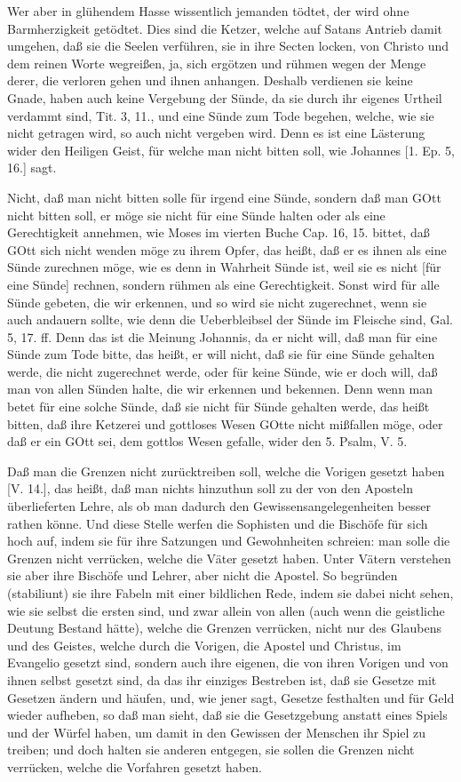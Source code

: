 Wer aber in glühendem Hasse wissentlich jemanden tödtet, der wird ohne Barmherzigkeit getödtet. Dies sind die Ketzer, welche auf Satans Antrieb damit umgehen, daß sie die Seelen verführen, sie in ihre Secten locken, von Christo und dem reinen Worte wegreißen, ja, sich ergötzen und rühmen wegen der Menge derer, die verloren gehen und ihnen anhangen. Deshalb verdienen sie keine Gnade, haben auch keine Vergebung der Sünde, da sie durch ihr eigenes Urtheil verdammt sind, Tit. 3, 11., und eine Sünde zum Tode begehen, welche, wie sie nicht getragen wird, so auch nicht vergeben wird. Denn es ist eine Lästerung wider den Heiligen Geist, für welche man nicht bitten soll, wie Johannes [1. Ep. 5, 16.] sagt.

Nicht, daß man nicht bitten solle für irgend eine Sünde, sondern daß man GOtt nicht bitten soll, er möge sie nicht für eine Sünde halten oder als eine Gerechtigkeit annehmen, wie Moses im vierten Buche Cap. 16, 15. bittet, daß GOtt sich nicht wenden möge zu ihrem Opfer, das heißt, daß er es ihnen als eine Sünde zurechnen möge, wie es denn in Wahrheit Sünde ist, weil sie es nicht [für eine Sünde] rechnen, sondern rühmen als eine Gerechtigkeit. Sonst wird für alle Sünde gebeten, die wir erkennen, und so wird sie nicht zugerechnet, wenn sie auch andauern sollte, wie denn die Ueberbleibsel der Sünde im Fleische sind, Gal. 5, 17. ff. Denn das ist die Meinung Johannis, da er nicht will, daß man für eine Sünde zum Tode bitte, das heißt, er will nicht, daß sie für eine Sünde gehalten werde, die nicht zugerechnet werde, oder für keine Sünde, wie er doch will, daß man von allen Sünden halte, die wir erkennen und bekennen. Denn wenn man betet für eine solche Sünde, daß sie nicht für Sünde gehalten werde, das heißt bitten, daß ihre Ketzerei und gottloses Wesen GOtte nicht mißfallen möge, oder daß er ein GOtt sei, dem gottlos Wesen gefalle, wider den 5. Psalm, V. 5.

Daß man die Grenzen nicht zurücktreiben soll, welche die Vorigen gesetzt haben [V. 14.], das heißt, daß man nichts hinzuthun soll zu der von den Aposteln überlieferten Lehre, als ob man dadurch den Gewissensangelegenheiten besser rathen könne. Und diese Stelle werfen die Sophisten und die Bischöfe für sich hoch auf, indem sie für ihre Satzungen und Gewohnheiten schreien: man solle die Grenzen nicht verrücken, welche die Väter gesetzt haben. Unter Vätern verstehen sie aber ihre Bischöfe und Lehrer, aber nicht die Apostel. So begründen (stabiliunt) sie ihre Fabeln mit einer bildlichen Rede, indem sie dabei nicht sehen, wie sie selbst die ersten sind, und zwar allein von allen (auch wenn die geistliche Deutung Bestand hätte), welche die Grenzen verrücken, nicht nur des Glaubens und des Geistes, welche durch die Vorigen, die Apostel und Christus, im Evangelio gesetzt sind, sondern auch ihre eigenen, die von ihren Vorigen und von ihnen selbst gesetzt sind, da das ihr einziges Bestreben ist, daß sie Gesetze mit Gesetzen ändern und häufen, und, wie jener sagt, Gesetze festhalten und für Geld wieder aufheben, so daß man sieht, daß sie die Gesetzgebung anstatt eines Spiels und der Würfel haben, um damit in den Gewissen der Menschen ihr Spiel zu treiben; und doch halten sie anderen entgegen, sie sollen die Grenzen nicht verrücken, welche die Vorfahren gesetzt haben.


